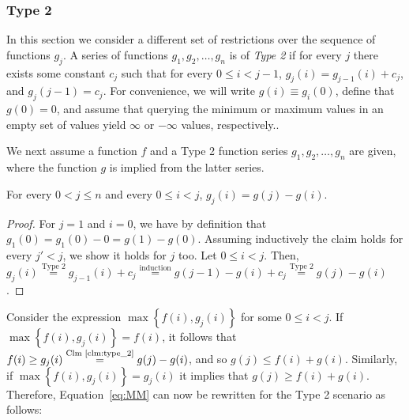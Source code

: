 \subsubsection{Type 2}
In this section we consider a different set of restrictions over the sequence of functions $g_j$. 
A series of functions $g_1, g_2, \ldots, g_n$ is of \emph{Type 2} if for every $j$ there exists some constant $c_j$ such that for every $0 \leq i < j-1$, $g_j(i) = g_{j-1}(i) + c_j$, and $g_j(j-1) = c_j$. For convenience, we will write $g(i) \equiv g_i(0)$, define that $g(0) = 0$, and assume that querying the minimum or maximum values in an empty set of values yield $\infty$ or $-\infty$ values, respectively..

We next assume a function $f$ and a Type 2 function series $g_1, g_2, \ldots, g_n$ are given, where the function $g$ is implied from the latter series. 

\begin{claim}
\label{clm:type_2}
	For every $0 < j \leq n$ and every $0 \leq i < j$, $g_j(i) = g(j) - g(i)$.
\end{claim} 

\begin{proof}
	For $j=1$ and $i=0$, we have by definition that $g_1(0) = g_1(0) - 0 = g(1) - g(0)$. 
	Assuming inductively the claim holds for every $j' < j$, we show it holds for $j$ too. Let $0 \leq i < j$. Then,
	$g_j(i) \stackrel{\text{Type 2}}{=} g_{j-1}(i) + c_j \stackrel{\text{induction}}{=} g(j-1) - g(i) + c_j \stackrel{\text{Type 2}}{=} g(j) - g(i)$.
\end{proof}

Consider the expression $\max\left\{f(i), g_j(i)\right\}$ for some $0 \leq i < j$. If $\max\left\{f(i), g_j(i)\right\} = f(i)$, it follows that $f(i) \geq g_j(i) \stackrel{\text{Clm~\ref{clm:type_2}}}{=} g(j) - g(i)$, and so $g(j) \leq f(i) + g(i)$. Similarly, if $\max\left\{f(i), g_j(i)\right\} = g_j(i)$ it implies that $g(j) \geq f(i) + g(i)$. Therefore,  Equation~\ref{eq:MM} can now be rewritten for the Type 2 scenario as follows:

